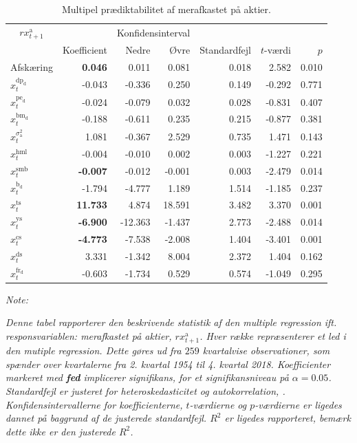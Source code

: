 \documentclass[
  a4paper,
  oneside]{memoir}
\begin{document}
\begin{table}[!h]

\caption{\label{tab:MULT-ak}Multipel prædiktabilitet af merafkastet på aktier.}
\centering
\begin{threeparttable}
\begin{tabular}[t]{lrrrrrr}
\toprule
\multicolumn{1}{c}{$rx_{t+1}^{\text{a}}$} & \multicolumn{1}{c}{ } & \multicolumn{2}{c}{Konfidensinterval} & \multicolumn{3}{c}{ } \\
\cmidrule(l{3pt}r{3pt}){1-1} \cmidrule(l{3pt}r{3pt}){3-4}
  & Koefficient & Nedre & Øvre & Standardfejl & $t$-værdi & $p$\\
\midrule
\rowcolor{gray!6}  Afskæring & \textbf{ 0.046} & 0.011 & 0.081 & 0.018 & 2.582 & 0.010\\
$x_t^{\text{dp}_{\text{d}}}$ & -0.043 & -0.336 & 0.250 & 0.149 & -0.292 & 0.771\\
\rowcolor{gray!6}  $x_t^{\text{pe}_{\text{d}}}$ & -0.024 & -0.079 & 0.032 & 0.028 & -0.831 & 0.407\\
$x_t^{\text{bm}_{\text{d}}}$ & -0.188 & -0.611 & 0.235 & 0.215 & -0.877 & 0.381\\
\rowcolor{gray!6}  $x_t^{\sigma_{\text{a}}^2}$ & 1.081 & -0.367 & 2.529 & 0.735 & 1.471 & 0.143\\
$x_t^{\text{hml}}$ & -0.004 & -0.010 & 0.002 & 0.003 & -1.227 & 0.221\\
\rowcolor{gray!6}  $x_t^{\text{smb}}$ & \textbf{-0.007} & -0.012 & -0.001 & 0.003 & -2.479 & 0.014\\
$x_t^{\text{b}_{\text{d}}}$ & -1.794 & -4.777 & 1.189 & 1.514 & -1.185 & 0.237\\
\rowcolor{gray!6}  $x_t^{\text{ts}}$ & \textbf{11.733} & 4.874 & 18.591 & 3.482 & 3.370 & 0.001\\
$x_t^{\text{ys}}$ & \textbf{-6.900} & -12.363 & -1.437 & 2.773 & -2.488 & 0.014\\
\rowcolor{gray!6}  $x_t^{\text{cs}}$ & \textbf{-4.773} & -7.538 & -2.008 & 1.404 & -3.401 & 0.001\\
$x_t^{\text{ds}}$ & 3.331 & -1.342 & 8.004 & 2.372 & 1.404 & 0.162\\
\rowcolor{gray!6}  $x_t^{\text{fr}_{\text{d}}}$ & -0.603 & -1.734 & 0.529 & 0.574 & -1.049 & 0.295\\
\bottomrule
\end{tabular}
\begin{tablenotes}
\item \textit{Note: } 
\item \textit{Denne tabel rapporterer den beskrivende statistik af den multiple regression ift. responsvariablen: merafkastet på aktier, $rx_{t+1}^{\text{a}}$. Hver række repræsenterer et led i den mutiple regression. Dette gøres ud fra $259$ kvartalvise observationer, som spænder over kvartalerne fra 2. kvartal 1954 til 4. kvartal 2018. Koefficienter markeret med \textbf{fed} implicerer signifikans, for et signifikansniveau på $\alpha=0.05$. Standardfejl er justeret for heteroskedasticitet og autokorrelation, \citep{Newey1987}. Konfidensintervallerne for koefficienterne, $t$-værdierne og $p$-værdierne er ligedes dannet på baggrund af de justerede standardfejl. $R^2$ er ligedes rapporteret, bemærk dette ikke er den justerede $R^2$.}

\end{tablenotes}
\end{threeparttable}
\end{table}
\end{document}

